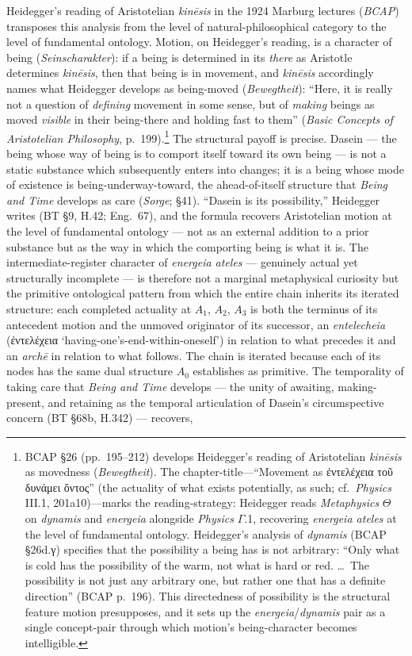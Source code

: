 \documentclass{article}
\newcommand{\gk}[1]{{\greekfont #1}}
\begin{document}
Heidegger's reading of Aristotelian \textit{kinēsis} in the 1924 Marburg lectures (\textit{BCAP}) transposes this analysis from the level of natural-philosophical category to the level of fundamental ontology. Motion, on Heidegger's reading, is a character of being (\textit{Seinscharakter}): if a being is determined in its \textit{there} as Aristotle determines \textit{kinēsis}, then that being is in movement, and \textit{kinēsis} accordingly names what Heidegger develops as being-moved (\textit{Bewegtheit}): ``Here, it is really not a question of \textit{defining} movement in some sense, but of \textit{making} beings as moved \textit{visible} in their being-there and holding fast to them'' (\textit{Basic Concepts of Aristotelian Philosophy}, p.~199).\footnote{BCAP §26 (pp.~195--212) develops Heidegger's reading of Aristotelian \textit{kinēsis} as movedness (\textit{Bewegtheit}). The chapter-title---``Movement as \gk{ἐντελέχεια τοῦ δυνάμει ὄντος}'' (the actuality of what exists potentially, as such; cf.~\textit{Physics} III.1, 201a10)---marks the reading-strategy: Heidegger reads \textit{Metaphysics} $\Theta$ on \textit{dynamis} and \textit{energeia} alongside \textit{Physics} $\Gamma$.1, recovering \textit{energeia ateles} at the level of fundamental ontology. Heidegger's analysis of \textit{dynamis} (BCAP §26d.γ) specifies that the possibility a being has is not arbitrary: ``Only what is cold has the possibility of the warm, not what is hard or red. \ldots\ The possibility is not just any arbitrary one, but rather one that has a definite direction'' (BCAP p.~196). This directedness of possibility is the structural feature motion presupposes, and it sets up the \textit{energeia}/\textit{dynamis} pair as a single concept-pair through which motion's being-character becomes intelligible.} The structural payoff is precise. Dasein --- the being whose way of being is to comport itself toward its own being --- is not a static substance which subsequently enters into changes; it is a being whose mode of existence is being-underway-toward, the ahead-of-itself structure that \textit{Being and Time} develops as care (\textit{Sorge}; \S 41). ``Dasein is its possibility,'' Heidegger writes (BT \S 9, H.42; Eng.~67), and the formula recovers Aristotelian motion at the level of fundamental ontology --- not as an external addition to a prior substance but as the way in which the comporting being is what it is. The intermediate-register character of \textit{energeia ateles} --- genuinely actual yet structurally incomplete --- is therefore not a marginal metaphysical curiosity but the primitive ontological pattern from which the entire chain inherits its iterated structure: each completed actuality at $A_1$, $A_2$, $A_3$ is both the terminus of its antecedent motion and the unmoved originator of its successor, an \textit{entelecheia} (\gk{ἐντελέχεια} `having-one's-end-within-oneself') in relation to what precedes it and an \textit{archē} in relation to what follows. The chain is iterated because each of its nodes has the same dual structure $A_0$ establishes as primitive. The temporality of taking care that \textit{Being and Time} develops --- the unity of awaiting, making-present, and retaining as the temporal articulation of Dasein's circumspective concern (BT \S 68b, H.342) --- recovers, 
\end{document}
